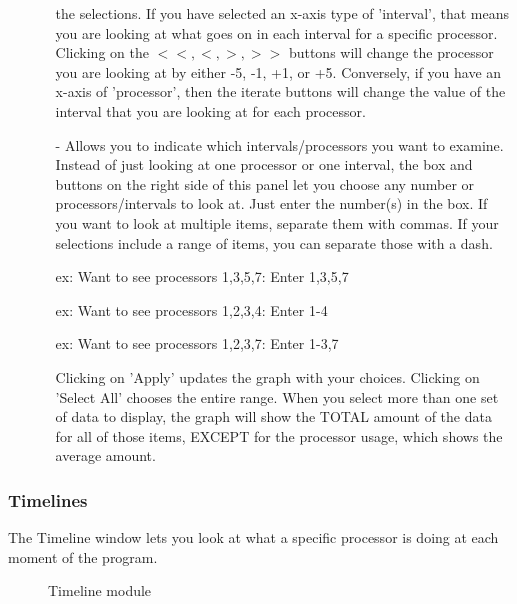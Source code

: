 \documentclass[10pt,dvips]{article}
\begin{document}
\begin{enumerate}
\begin{itemize}
        the selections.  If you have selected an x-axis type of 'interval',
        that means you are looking at what goes on in each interval for a
        specific processor.  Clicking on the $<<, <, >, >>$ buttons will change
        the processor you are looking at by either -5, -1, +1, or +5.
        Conversely, if you have an x-axis of 'processor', then the iterate
        buttons will change the value of the interval that you are looking at
        for each processor.
      \item[-]
        Allows you to indicate which intervals/processors you want to examine.
        Instead of just looking at one processor or one interval, the box and
        buttons on the right side of this panel let you choose any number or
        processors/intervals to look at.  Just enter the number(s) in the box.
        If you want to look at multiple items, separate them with commas.  If
        your selections include a range of items, you can separate those with
        a dash.

        ex: Want to see processors 1,3,5,7:  Enter 1,3,5,7

	ex: Want to see processors 1,2,3,4:  Enter 1-4

	ex: Want to see processors 1,2,3,7:  Enter 1-3,7

        Clicking on 'Apply' updates the graph with your choices.
        Clicking on 'Select All' chooses the entire range.  When you select more
        than one set of data to display, the graph will show the TOTAL amount of
        the data for all of those items, EXCEPT for the processor usage, which
        shows the average amount.
      \end{itemize}
    \end{enumerate}

\subsubsection{Timelines}

   The Timeline window lets you look at what a specific processor is doing at
   each moment of the program.

   \begin{figure}[htb]
   \center
   \caption{Timeline module}
   \label{timeline}
   \end{figure}
\end{document}
